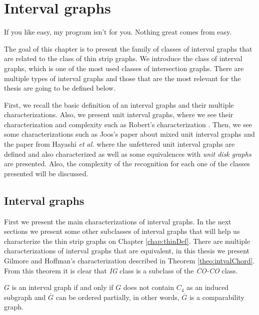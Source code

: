 \chapter{Interval graphs}
\label{chap:interval}

\begin{fquote}
  If you like easy, my program isn’t for you. Nothing great comes from easy.
\end{fquote}


The goal of this chapter is to present the family of classes of interval graphs that are related to the class of thin strip graphs. We introduce the class of interval graphs, which is
 one of the most used classes of intersection graphs. There are multiple types of
 interval graphs and those that are the most relevant for the thesis are going to be defined below.

 First, we recall the basic definition of an interval graphs and their multiple characterizations. Also, we present unit interval graphs, where we see their characterization and complexity such as Robert's characterization \cite{roberts1968representations}. Then, we see some characterizations such as Joos's paper about mixed unit interval graphs \cite{joosCharacterizationMixedUnit2013} and the paper from Hayashi \textit{et al.} \cite{hayashiThinStripGraphs2017} where the unfettered unit interval graphs are defined and also characterized as well as some equivalences with \emph{unit disk graphs} are presented. Also, the complexity of the recognition for each one of the classes presented will be discussed.

\section{Interval graphs}

First we present the main characterizations of interval graphs. In the next sections we present some other subclasses of interval graphs that will help us characterize the thin strip graphs on Chapter \ref{chap:thinDef}. There are multiple characterizations of interval graphs that are equivalent, in this thesis we present Gilmore and Hoffman's characterization described in Theorem \ref{theo:intvalChord}. From this theorem it is clear that \textit{IG} class is a subclass of the \textit{CO-CO} class.

\begin{theorem}
  \label{theo:intvalChord}
  $G$ is an interval graph if and only if $G$ does not contain $C_4$ as an induced subgraph and $\overline{G}$ can be ordered partially, in other words, $\overline{G}$ is a comparability graph.
\end{theorem}

